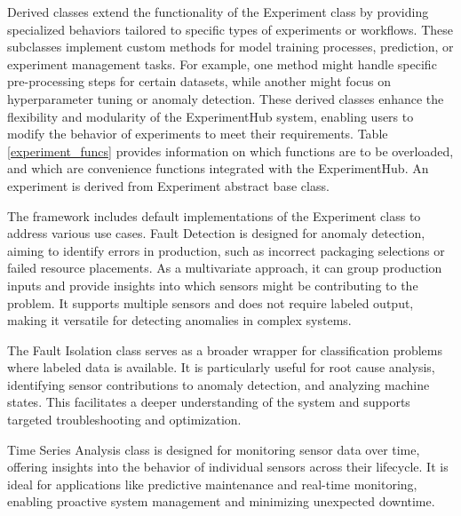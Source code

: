 \documentclass[preprint,12pt, a4paper]{elsarticle}
\begin{document}

Derived classes extend the functionality of the Experiment class by providing specialized behaviors tailored to specific types of experiments or workflows. These subclasses implement custom methods for model training processes, prediction, or experiment management tasks. For example, one method might handle specific pre-processing steps for certain datasets, while another might focus on hyperparameter tuning or anomaly detection. These derived classes enhance the flexibility and modularity of the ExperimentHub system, enabling users to modify the behavior of experiments to meet their requirements. Table \ref{experiment_funcs} provides information on which functions are to be overloaded, and which are convenience functions integrated with the ExperimentHub. An experiment is derived from Experiment abstract base class.


The framework includes default implementations of the Experiment class to address various use cases. Fault Detection is designed for anomaly detection, aiming to identify errors in production, such as incorrect packaging selections or failed resource placements. As a multivariate approach, it can group production inputs and provide insights into which sensors might be contributing to the problem. It supports multiple sensors and does not require labeled output, making it versatile for detecting anomalies in complex systems.

The Fault Isolation class serves as a broader wrapper for classification problems where labeled data is available. It is particularly useful for root cause analysis, identifying sensor contributions to anomaly detection, and analyzing machine states. This facilitates a deeper understanding of the system and supports targeted troubleshooting and optimization.

Time Series Analysis class is designed for monitoring sensor data over time, offering insights into the behavior of individual sensors across their lifecycle. It is ideal for applications like predictive maintenance and real-time monitoring, enabling proactive system management and minimizing unexpected downtime.
\end{document}
